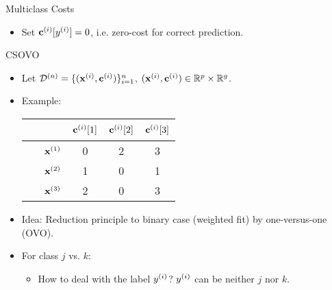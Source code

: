 \documentclass[11pt,compress,t,notes=noshow, xcolor=table]{beamer}
\begin{document}
\begin{vbframe}{Multiclass Costs}
\begin{itemize}
        \item Set $\mathbf{c}^{(i)}[y^{(i)}] = 0$, i.e. zero-cost for correct prediction.
        \vspace{5pt}
        
            
    \end{itemize}
\end{vbframe}

\begin{vbframe}{CSOVO \href{https://proceedings.mlr.press/v39/lin14.pdf}{}}
    

    \begin{itemize}
        \item Let $\mathcal{D}^{(n)} = \{(\mathbf{x}^{(i)}, \mathbf{c}^{(i)})\}_{i=1}^n$, $(\mathbf{x}^{(i)}, \mathbf{c}^{(i)}) \in \mathbb{R}^p \times \mathbb{R}^g$.  
        \item Example:

                        \begin{center}
                            \begin{tabular}{cc|ccc}\
        			& & $\mathbf{c}^{(i)}[1]$ & $\mathbf{c}^{(i)}[2]$ & $\mathbf{c}^{(i)}[3]$  \\
        			\hline & $\mathbf{x}^{(1)}$ & 0 & 2 & 3\\
        			& $\mathbf{x}^{(2)}$ & 1 & 0 & 1\\
                 	& $\mathbf{x}^{(3)}$ & 2 & 0 & 3\\
                \end{tabular}
        \end{center}
        
        
        \item Idea: Reduction principle to binary case (weighted fit) by one-versus-one (OVO). 
        
        
        \item For class $j$ vs. $k$:
        \begin{itemize}
            \item How to deal with the label $y^{(i)}$? $y^{(i)}$ can be neither $j$ nor $k$.
            \vspace{5pt}
            

\end{itemize}
\end{itemize}
\end{vbframe}
\end{document}
